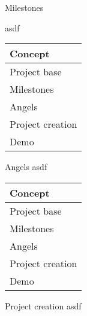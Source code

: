\documentclass{beamer}
\begin{document}
\begin{frame}{Milestones}




asdf
\end{frame}



\begin{frame}
	\begin{tabularx}{\textwidth}{X}
		\hline
		Concept\\
		\hline
		Project base\\
		\hline
		Milestones\\
		\hline
		\rowcolor{hcolor}
		Angels\\
		\hline
		Project creation\\
		\hline
		Demo\\
		\hline
	\end{tabularx}
\end{frame}



\begin{frame}{Angels}
asdf
\end{frame}




\begin{frame}
	\begin{tabularx}{\textwidth}{X}
		\hline
		Concept\\
		\hline
		Project base\\
		\hline
		Milestones\\
		\hline
		Angels\\
		\hline
		\rowcolor{hcolor}
		Project creation\\
		\hline
		Demo\\
		\hline
	\end{tabularx}
\end{frame}


\begin{frame}{Project creation}
asdf
\end{frame}
\end{document}
